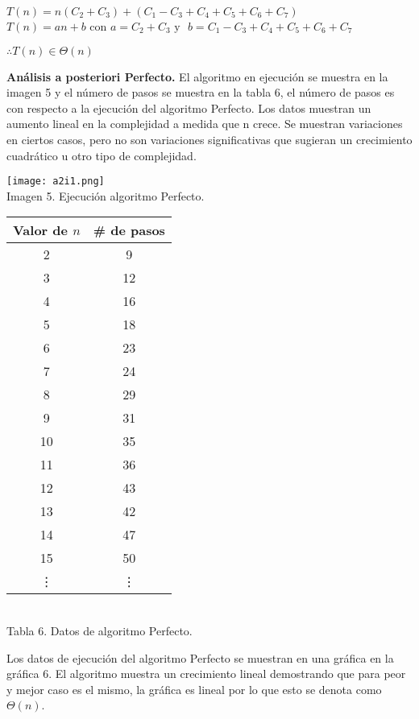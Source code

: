 \documentclass[12pt,twoside]{article}
\begin{document}
\begin{center}
  $T(n)=n(C_2+C_3)+(C_1-C_3+C_4+C_5+C_6+C_7)$
  $T(n)=an+b \text{ con }a=C_2+C_3 \text{ y }$
  $b=C_1-C_3+C_4+C_5+C_6+C_7$
  \par

  $\therefore T(n)\in \Theta(n)$
\end{center}

\newpage
\textbf{Análisis a posteriori Perfecto.}
El algoritmo en ejecución se muestra en la imagen 5 y el número de pasos se muestra en la tabla 6, el número de pasos es con respecto a la ejecución del algoritmo Perfecto. Los datos
muestran un aumento lineal en la complejidad a medida que n crece. Se muestran variaciones en ciertos casos, pero no son variaciones significativas que sugieran un crecimiento
cuadrático u otro tipo de complejidad.
\medskip

\begin{minipage}{.45\linewidth}
  \centering
  \texttt{[image: a2i1.png]}
  \\
  Imagen 5. Ejecución algoritmo Perfecto.
\end{minipage}\hfill
\begin{minipage}{.45\linewidth}
  \centering
  \begin{tabular}{|c|c|}
    \hline
    \textbf{Valor de $n$} & \textbf{\# de pasos} \\
    \hline
    2  & 9 \\
    3  & 12 \\
    4  & 16 \\
    5  & 18 \\
    6  & 23 \\
    7  & 24 \\
    8  & 29 \\
    9  & 31 \\
    10 & 35 \\
    11 & 36 \\
    12 & 43 \\
    13 & 42 \\
    14 & 47 \\
    15 & 50 \\
    \vdots & \vdots\\
    \hline
  \end{tabular}
  \\
  Tabla 6. Datos de algoritmo Perfecto.
\end{minipage}
\medskip

Los datos de ejecución del algoritmo Perfecto se muestran en una gráfica en la gráfica 6. El algoritmo muestra un
crecimiento lineal demostrando que para peor y mejor caso es el mismo, la gráfica es lineal por lo que esto se denota como
$\Theta(n)$.
\end{document}
